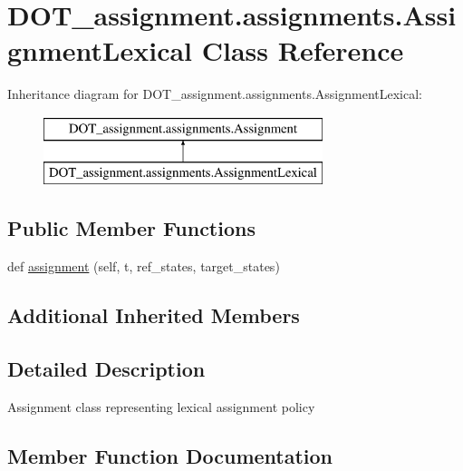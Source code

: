 \hypertarget{class_d_o_t__assignment_1_1assignments_1_1_assignment_lexical}{}\section{D\+O\+T\+\_\+assignment.\+assignments.\+Assignment\+Lexical Class Reference}
\label{class_d_o_t__assignment_1_1assignments_1_1_assignment_lexical}
Inheritance diagram for D\+O\+T\+\_\+assignment.\+assignments.\+Assignment\+Lexical\+:\begin{figure}[H]
\begin{center}
\leavevmode
\includegraphics[height=2.000000cm]{class_d_o_t__assignment_1_1assignments_1_1_assignment_lexical}
\end{center}
\end{figure}
\subsection*{Public Member Functions}
\begin{DoxyCompactItemize}
\item 
def \mbox{\hyperlink{class_d_o_t__assignment_1_1assignments_1_1_assignment_lexical_a0c62d5afabd6206ed74cd0d9bdcb6a0e}{assignment}} (self, t, ref\+\_\+states, target\+\_\+states)
\end{DoxyCompactItemize}
\subsection*{Additional Inherited Members}


\subsection{Detailed Description}
\begin{DoxyVerb}Assignment class representing lexical assignment policy
\end{DoxyVerb}
 

\subsection{Member Function Documentation}
\mbox{\label{class_d_o_t__assignment_1_1assignments_1_1_assignment_lexical_a0c62d5afabd6206ed74cd0d9bdcb6a0e}} 
